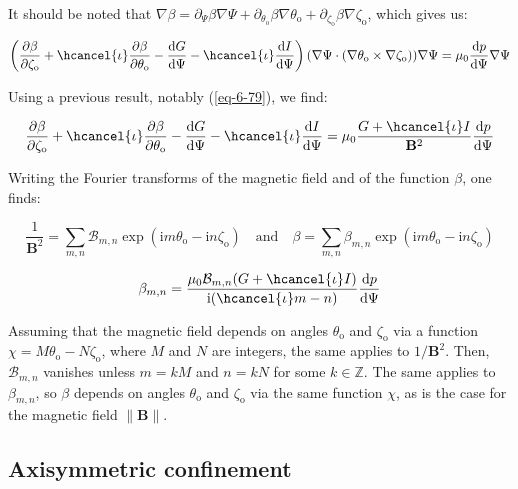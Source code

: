 It should be noted that $\nabla\beta=\partial_\Psi\beta\nabla\Psi+\partial_{\theta_\text{o}}\beta\nabla\theta_\text{o}+\partial_{\zeta_\text{o}}\beta\nabla\zeta_\text{o}$, which gives us:

\begin{equation}
    \left(\frac{\partial\beta}{\partial\zeta_\text{o}}+\hcancel{\iota}\frac{\partial\beta}{\partial\theta_\text{o}}-\frac{\mathrm{d}G}{\mathrm{d}\Psi}-\hcancel{\iota}\frac{\mathrm{d}I}{\mathrm{d}\Psi}\right)(\nabla\Psi\cdot(\nabla\theta_\text{o}\times\nabla\zeta_\text{o}))\nabla\Psi=\mu_0\frac{\mathrm{d}p}{\mathrm{d}\Psi}\nabla\Psi
\end{equation}

Using a previous result, notably (\ref{eq-6-79}), we find:

\begin{equation}
    \frac{\partial\beta}{\partial\zeta_\text{o}}+\hcancel{\iota}\frac{\partial\beta}{\partial\theta_\text{o}}-\frac{\mathrm{d}G}{\mathrm{d}\Psi}-\hcancel{\iota}\frac{\mathrm{d}I}{\mathrm{d}\Psi}=\mu_0\frac{G+\hcancel{\iota}I}{\mathbf{B}^2}\frac{\mathrm{d}p}{\mathrm{d}\Psi}
\end{equation}

Writing the Fourier transforms of the magnetic field and of the function $\beta$, one finds:

\begin{equation}
    \frac{1}{\mathbf{B}^2}=\sum_{m,n}\mathcal{B}_{m,n}\exp(\mathrm{i}m\theta_\text{o}-\mathrm{i}n\zeta_\text{o})\quad\text{and}\quad\beta=\sum_{m,n}\beta_{m,n}\exp(\mathrm{i}m\theta_\text{o}-\mathrm{i}n\zeta_\text{o})
\end{equation}

\begin{equation}
    \beta_{m,n}=\frac{\mu_0\mathcal{B}_{m,n}(G+\hcancel{\iota}I)}{\mathrm{i}(\hcancel{\iota}m-n)}\frac{\mathrm{d}p}{\mathrm{d}\Psi}
\end{equation}

Assuming that the magnetic field depends on angles $\theta_\text{o}$ and $\zeta_\text{o}$ via a function $\chi = M\theta_\text{o} - N\zeta_\text{o}$, where $M$ and $N$ are integers, the same applies to $1/\mathbf{B}^2$. Then, $\mathcal{B}_{m,n}$ vanishes unless $m=kM$ and $n=kN$ for some $k\in\mathbb{Z}$. The same applies to $\beta_{m,n}$, so $\beta$ depends on angles $\theta_\text{o}$ and $\zeta_\text{o}$ via the same function $\chi$, as is the case for the magnetic field $\|\mathbf{B}\|$.

\subsection{Axisymmetric confinement}

